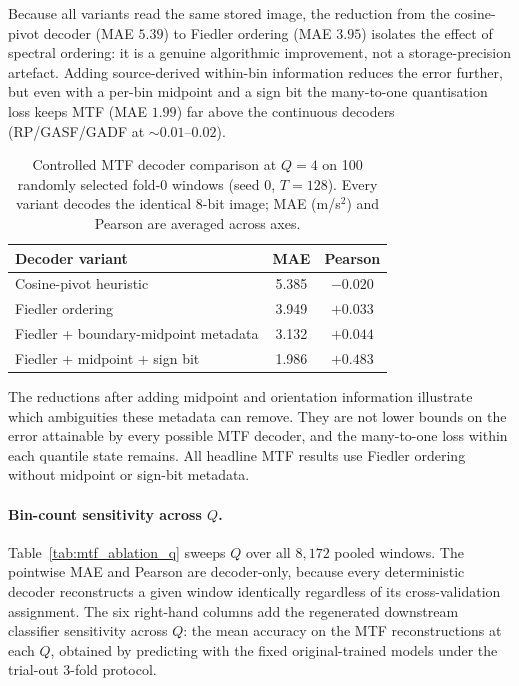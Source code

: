 \documentclass[10pt,a4paper,parskip=half-]{scrartcl}
\begin{document}
Because all variants read the same stored image, the reduction from the cosine-pivot decoder (MAE $5.39$) to Fiedler ordering (MAE $3.95$) isolates the effect of spectral ordering: it is a genuine algorithmic improvement, not a storage-precision artefact. Adding source-derived within-bin information reduces the error further, but even with a per-bin midpoint and a sign bit the many-to-one quantisation loss keeps MTF (MAE $1.99$) far above the continuous decoders (RP/GASF/GADF at $\sim 0.01$--$0.02$).

\begin{table}[H]
\centering
\caption{Controlled MTF decoder comparison at $Q=4$ on 100 randomly selected fold-0 windows (seed 0, $T=128$). Every variant decodes the identical 8-bit image; MAE (m/s$^2$) and Pearson are averaged across axes.}
\label{tab:supp_mtf_ablation}
\setlength{\tabcolsep}{4pt}
\footnotesize
\begin{tabular}{lcc}
\toprule
Decoder variant & MAE & Pearson \\
\midrule
Cosine-pivot heuristic               & 5.385 & $-0.020$ \\
Fiedler ordering                      & 3.949 & $+0.033$ \\
Fiedler + boundary-midpoint metadata  & 3.132 & $+0.044$ \\
Fiedler + midpoint + sign bit         & 1.986 & $+0.483$ \\
\bottomrule
\end{tabular}
\end{table}

The reductions after adding midpoint and orientation information illustrate which ambiguities these metadata can remove. They are not lower bounds on the error attainable by every possible MTF decoder, and the many-to-one loss within each quantile state remains. All headline MTF results use Fiedler ordering without midpoint or sign-bit metadata.

\paragraph*{Bin-count sensitivity across $Q$.}
Table~\ref{tab:mtf_ablation_q} sweeps $Q$ over all $8{,}172$ pooled windows. The pointwise MAE and Pearson are decoder-only, because every deterministic decoder reconstructs a given window identically regardless of its cross-validation assignment. The six right-hand columns add the regenerated downstream classifier sensitivity across $Q$: the mean accuracy on the MTF reconstructions at each $Q$, obtained by predicting with the fixed original-trained models under the trial-out 3-fold protocol.
\end{document}

